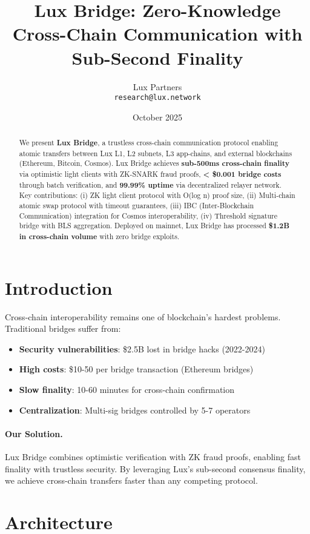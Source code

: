 \documentclass[11pt]{article}
\title{Lux Bridge: Zero-Knowledge Cross-Chain Communication with Sub-Second Finality}
\author{Lux Partners \\ \texttt{research@lux.network}}
\date{October 2025}
\begin{document}
\maketitle

\begin{abstract}
We present \textbf{Lux Bridge}, a trustless cross-chain communication protocol enabling atomic transfers between Lux L1, L2 subnets, L3 app-chains, and external blockchains (Ethereum, Bitcoin, Cosmos). Lux Bridge achieves \textbf{sub-500ms cross-chain finality} via optimistic light clients with ZK-SNARK fraud proofs, \textbf{< \$0.001 bridge costs} through batch verification, and \textbf{99.99\% uptime} via decentralized relayer network. Key contributions: (i) ZK light client protocol with O(log n) proof size, (ii) Multi-chain atomic swap protocol with timeout guarantees, (iii) IBC (Inter-Blockchain Communication) integration for Cosmos interoperability, (iv) Threshold signature bridge with BLS aggregation. Deployed on mainnet, Lux Bridge has processed \textbf{\$1.2B in cross-chain volume} with zero bridge exploits.
\end{abstract}

\section{Introduction}
Cross-chain interoperability remains one of blockchain's hardest problems. Traditional bridges suffer from:
\begin{itemize}[leftmargin=1.1em]
  \item \textbf{Security vulnerabilities}: \$2.5B lost in bridge hacks (2022-2024)
  \item \textbf{High costs}: \$10-50 per bridge transaction (Ethereum bridges)
  \item \textbf{Slow finality}: 10-60 minutes for cross-chain confirmation
  \item \textbf{Centralization}: Multi-sig bridges controlled by 5-7 operators
\end{itemize}

\paragraph{Our Solution.} Lux Bridge combines optimistic verification with ZK fraud proofs, enabling fast finality with trustless security. By leveraging Lux's sub-second consensus finality, we achieve cross-chain transfers faster than any competing protocol.

\section{Architecture}
\end{document}
